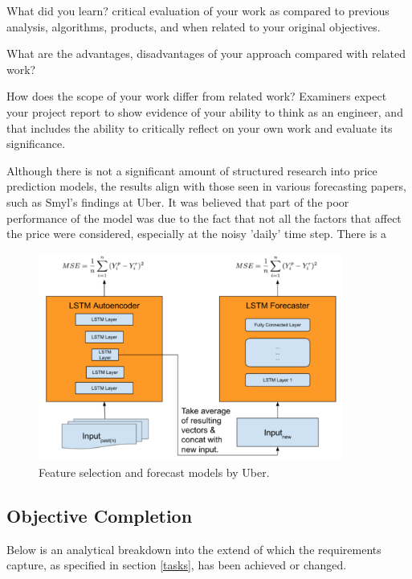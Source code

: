 \documentclass[10pt,onecolumn,letterpaper]{article}
\begin{document}
What did you learn?
critical evaluation of your work as compared to previous analysis, algorithms, products, and when related to your original objectives.

What are the advantages, disadvantages of your approach compared with related work? 

How does the scope of your work differ from related work? Examiners expect your project report to show evidence of your ability to think as an engineer, and that includes the ability to critically reflect on your own work and evaluate its significance. 
\fi


Although there is not a significant amount of structured research into price prediction models, the results align with those seen in various forecasting papers, such as Smyl's findings at Uber. It was believed that part of the poor performance of the model was due to the fact that not all the factors that affect the price were considered, especially at the noisy 'daily' time step. There is a 

\begin{figure}[!hbt!]
\centering
\includegraphics[width=10cm]{uber_architecture}
\caption{Feature selection and forecast models by Uber.}
\label{data_structuring}
\end{figure}

\subsection{Objective Completion}

Below is an analytical breakdown into the extend of which the requirements capture, as specified in section \ref{tasks}, has been achieved or changed. 
\end{document}
